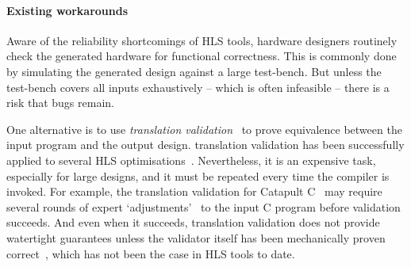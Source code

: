 \paragraph{Existing workarounds}

Aware of the reliability shortcomings of \gls{HLS} tools, hardware designers
routinely check the generated hardware for functional correctness.  This is
commonly done by simulating the generated design against a large test-bench.
But unless the test-bench covers all inputs exhaustively -- which is often
infeasible -- there is a risk that bugs remain.

One alternative is to use \emph{\gls{translation
    validation}}~\cite{pnueli98_trans} to prove equivalence between the input
program and the output design. \Gls{translation validation} has been
successfully applied to several \gls{HLS} optimisations~\cite{kim04_autom_fsmd,
  karfa06_formal_verif_method_sched_high_synth,
  chouksey20_verif_sched_condit_behav_high_level_synth,
  banerjee14_verif_code_motion_techn_using_value_propag,
  chouksey19_trans_valid_code_motion_trans_invol_loops}.  Nevertheless, it is an
expensive task, especially for large designs, and it must be repeated every time
the compiler is invoked.  For example, the translation validation for Catapult
C~\cite{mentor20_catap_high_level_synth} may require several rounds of expert
`adjustments'~\cite[p.~3]{chauhan20_formal_ensur_equiv_c_rtl} to the input C
program before validation succeeds. And even when it succeeds, translation
validation does not provide watertight guarantees unless the validator itself
has been mechanically proven
correct~\cite[e.g.][]{tristan08_formal_verif_trans_valid}, which has not been
the case in \gls{HLS} tools to date.


